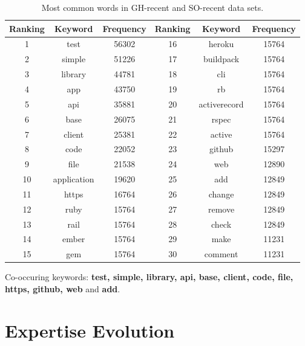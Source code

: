         
        \begin{table}
          \centering
          \caption{Most common words in GH-recent and SO-recent data sets.}\label{tab:RQ3_recent}
            \vspace{6pt} %
          \begin{tabular}{|c c c | c c c|}
            \hline
            Ranking & Keyword & Frequency & Ranking & Keyword & Frequency \\
            \hline\hline
            1 & test & 56302 & 16 & heroku & 15764 \\
            2 & simple & 51226 & 17 & buildpack & 15764 \\
            3 & library & 44781 & 18 & cli & 15764 \\
            4 & app & 43750 & 19 & rb & 15764 \\
            5 & api & 35881 & 20 & activerecord & 15764 \\
            6 & base & 26075 & 21 & rspec & 15764 \\
            7 & client & 25381 & 22 & active & 15764 \\
            8 & code & 22052 & 23 & github & 15297 \\
            9 & file & 21538 & 24 & web & 12890 \\
            10 & application & 19620 & 25 & add & 12849 \\
            11 & https & 16764 & 26 & change & 12849\\
            12 & ruby & 15764  & 27 & remove & 12849 \\
            13 & rail & 15764 & 28 & check & 12849\\
            14 & ember & 15764 & 29 & make & 11231 \\
            15 & gem & 15764 & 30 & comment & 11231\\
            \hline
          \end{tabular}
        \end{table}
        
        Co-occuring keywords: \textbf{test, simple, library, api, base, client, code, file, https, github, web} and \textbf{add}.
        
    
    \section{Expertise Evolution\label{sec:results_rq4}}
                
